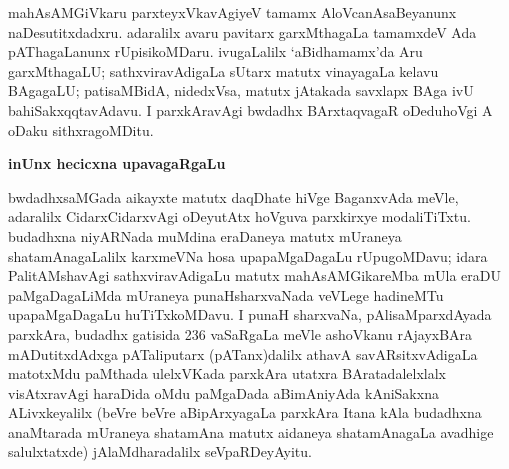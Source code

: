 mahAsAMGiVkaru parxteyxVkavAgiyeV tamamx AloVcanAsaBeyanunx naDesutitxdadxru. adaralilx avaru pavitarx garxMthagaLa tamamxdeV Ada pAThagaLanunx rUpisikoMDaru. ivugaLalilx `aBidhamamx'da Aru garxMthagaLU; sathxviravAdigaLa sUtarx matutx vinayagaLa kelavu BAgagaLU; patisaMBidA, nidedxVsa, matutx jAtakada savxlapx BAga ivU bahiSakxqqtavAdavu. I parxkAravAgi bwdadhx BArxtaqvagaR oDeduhoVgi A oDaku sithxragoMDitu.

\begin{center}
{\textbf{\Large inUnx hecicxna upavagaRgaLu}}
\end{center}

bwdadhxsaMGada aikayxte matutx daqDhate hiVge BaganxvAda meVle, adaralilx Cidarx\-CidarxvAgi oDeyutAtx hoVguva parxkirxye modaliTiTxtu. budadhxna niyARNada muMdina eraDaneya matutx mUraneya shatamAnagaLalilx karxmeVNa hosa upapaMgaDagaLu rUpugoMDavu; idara PalitAMshavAgi sathxviravAdigaLu matutx mahAsAMGikareMba mUla eraDU paMgaDagaLiMda mUraneya punaHsharxvaNada veVLege hadineMTu upapaMgaDagaLu huTiTxkoMDavu. I punaH sharxvaNa, pAlisaMparxdAyada parxkAra, budadhx gatisida 236 vaSaRgaLa meVle ashoVkanu rAjayxBAra mADutitxdAdxga pATaliputarx (pATanx)dalilx athavA savARsitxvAdigaLa matotxMdu paMthada ulelxVKada parxkAra utatxra BAratadalelxlalx visAtxravAgi haraDida oMdu paMgaDada aBimAniyAda kAniSakxna ALivxkeyalilx (beVre beVre aBipArxyagaLa parxkAra Itana kAla budadhxna anaMtarada mUraneya shatamAna matutx aidaneya shatamAnagaLa avadhige salulxtatxde) jAlaMdharadalilx seVpaRDeyAyitu.

